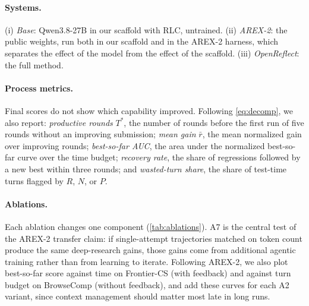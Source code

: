 \documentclass[11pt]{article}
\begin{document}
\paragraph{Systems.}
(i) \emph{Base}: Qwen3.8-27B in our scaffold with RLC, untrained. (ii) \emph{AREX-2}: the public weights, run both in our scaffold and in the AREX-2 harness, which separates the effect of the model from the effect of the scaffold. (iii) \emph{OpenReflect}: the full method.

\paragraph{Process metrics.}
Final scores do not show which capability improved. Following \cref{eq:decomp}, we also report: \emph{productive rounds} $T^{*}$, the number of rounds before the first run of five rounds without an improving submission; \emph{mean gain} $\bar{r}$, the mean normalized gain over improving rounds; \emph{best-so-far AUC}, the area under the normalized best-so-far curve over the time budget; \emph{recovery rate}, the share of regressions followed by a new best within three rounds; and \emph{wasted-turn share}, the share of test-time turns flagged by $R$, $N$, or $P$.

\paragraph{Ablations.}
Each ablation changes one component (\cref{tab:ablations}). A7 is the central test of the AREX-2 transfer claim: if single-attempt trajectories matched on token count produce the same deep-research gains, those gains come from additional agentic training rather than from learning to iterate. Following AREX-2, we also plot best-so-far score against time on Frontier-CS (with feedback) and against turn budget on BrowseComp (without feedback), and add these curves for each A2 variant, since context management should matter most late in long runs.
\end{document}
